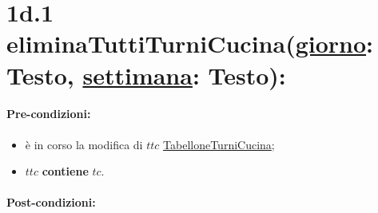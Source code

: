 \section*{1d.1 eliminaTuttiTurniCucina(\underline{giorno}: Testo, \underline{settimana}: Testo):}

\paragraph{Pre-condizioni:}
\begin{itemize}
 \item è in corso la modifica di $ttc$ \underline{TabelloneTurniCucina};
 \item $ttc$ \textbf{contiene} $tc$.
\end{itemize}

\paragraph{Post-condizioni:} 
